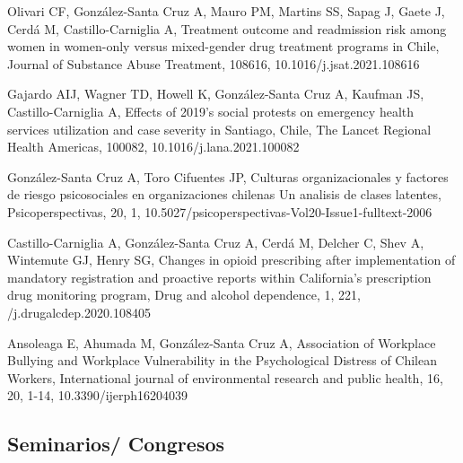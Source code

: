 \documentclass[11pt,a4paper,]{awesome-cv}
\begin{document}
\begin{cventries}
{\begin{cvitems}
\item Olivari CF, González-Santa Cruz A, Mauro PM, Martins SS, Sapag J, Gaete J, Cerdá M, Castillo-Carniglia A, Treatment outcome and readmission risk among women in women-only versus mixed-gender drug treatment programs in Chile, Journal of Substance Abuse Treatment, 108616, 10.1016/j.jsat.2021.108616
\item Gajardo AIJ, Wagner TD, Howell K, González-Santa Cruz A, Kaufman JS, Castillo-Carniglia A, Effects of 2019's social protests on emergency health services utilization and case severity in Santiago, Chile, The Lancet Regional Health Americas, 100082, 10.1016/j.lana.2021.100082
\item González-Santa Cruz A, Toro Cifuentes JP, Culturas organizacionales y factores de riesgo psicosociales en organizaciones chilenas Un analisis de clases latentes, Psicoperspectivas, 20, 1, 10.5027/psicoperspectivas-Vol20-Issue1-fulltext-2006
\item Castillo-Carniglia A, González-Santa Cruz A, Cerdá M, Delcher C, Shev A, Wintemute GJ, Henry SG, Changes in opioid prescribing after implementation of mandatory registration and proactive reports within California's prescription drug monitoring program, Drug and alcohol dependence, 1, 221, /j.drugalcdep.2020.108405
\item Ansoleaga E, Ahumada M, González-Santa Cruz A, Association of Workplace Bullying and Workplace Vulnerability in the Psychological Distress of Chilean Workers, International journal of environmental research and public health, 16, 20, 1-14, 10.3390/ijerph16204039
\end{cvitems}}
\end{cventries}

\subsection{Seminarios/ Congresos}\label{seminarios-congresos}
\end{document}
